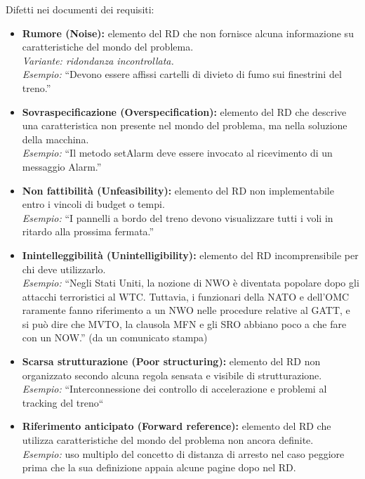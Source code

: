 \documentclass[../main.tex]{subfiles}
\begin{document}
Difetti nei documenti dei requisiti:
\begin{itemize}
    \item \textbf{Rumore (Noise):} elemento del RD che non fornisce alcuna informazione su caratteristiche del mondo del problema.\\
    \emph{Variante: ridondanza incontrollata.}\\
    \emph{Esempio:} ``Devono essere affissi cartelli di divieto di fumo sui finestrini del treno.''
    
    \item \textbf{Sovraspecificazione (Overspecification):} elemento del RD che descrive una caratteristica non presente nel mondo del problema, ma nella soluzione della macchina.\\
    \emph{Esempio:} ``Il metodo setAlarm deve essere invocato al ricevimento di un messaggio Alarm.''
    
    \item \textbf{Non fattibilità (Unfeasibility):} elemento del RD non implementabile entro i vincoli di budget o tempi.\\
    \emph{Esempio:} ``I pannelli a bordo del treno devono visualizzare tutti i voli in ritardo alla prossima fermata.''
    
    \item \textbf{Inintelleggibilità (Unintelligibility):} elemento del RD incomprensibile per chi deve utilizzarlo.\\
    \emph{Esempio:} ``Negli Stati Uniti, la nozione di NWO è diventata popolare dopo gli attacchi terroristici al WTC. Tuttavia, i funzionari della NATO e dell’OMC raramente fanno riferimento a un NWO nelle procedure relative al GATT, e si può dire che MVTO, la clausola MFN e gli SRO abbiano poco a che fare con un NOW.'' (da un comunicato stampa)
    
    \item \textbf{Scarsa strutturazione (Poor structuring):} elemento del RD non organizzato secondo alcuna regola sensata e visibile di strutturazione.\\
	\emph{Esempio:} ``Interconnessione dei controllo di accelerazione e problemi al tracking del treno``
    \item \textbf{Riferimento anticipato (Forward reference):} elemento del RD che utilizza caratteristiche del mondo del problema non ancora definite.\\
    \emph{Esempio:} uso multiplo del concetto di distanza di arresto nel caso peggiore prima che la sua definizione appaia alcune pagine dopo nel RD.
    

\end{itemize}
\end{document}
